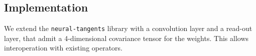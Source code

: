 \documentclass[tablecaption=bottom,wcp,nonatbib]{jmlr} %
\newcommand{\vX}{\mathbf{X}}
\begin{document}

\subsection{Implementation}
We extend the \texttt{neural-tangents} \citep{neuraltangents2020} library with a convolution layer and a read-out layer, that admit a 4-dimensional covariance tensor for the weights. This allows interoperation with existing operators.
\end{document}
